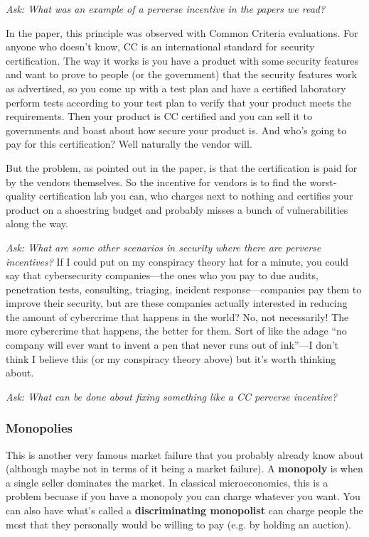 \documentclass[11pt]{article}
\begin{document}
{\it Ask: What was an example of a perverse incentive in the papers we read? }

In the paper, this principle was observed with Common Criteria evaluations. For anyone who doesn’t know, CC is an international standard for security certification. The way it works is you have a product with some security features and want to prove to people (or the government) that the security features work as advertised, so you come up with a test plan and have a certified laboratory perform tests according to your test plan to verify that your product meets the requirements. Then your product is CC certified and you can sell it to governments and boast about how secure your product is. And who’s going to pay for this certification? Well naturally the vendor will. 

But the problem, as pointed out in the paper, is that the certification is paid for by the vendors themselves. So the incentive for vendors is to find the worst-quality certification lab you can, who charges next to nothing and certifies your product on a shoestring budget and probably misses a bunch of vulnerabilities along the way. 

{\it Ask: What are some other scenarios in security where there are perverse incentives?} If I could put on my conspiracy theory hat for a minute, you could say that cybersecurity companies---the ones who you pay to due audits, penetration tests, consulting, triaging, incident response---companies pay them to improve their security, but are these companies actually interested in reducing the amount of cybercrime that happens in the world? No, not necessarily! The more cybercrime that happens, the better for them. Sort of like the adage ``no company will ever want to invent a pen that never runs out of ink''---I don't think I believe this (or my conspiracy theory above) but it's worth thinking about.

{\it Ask: What can be done about fixing something like a CC perverse incentive?}

\subsubsection{Monopolies}

This is another very famous market failure that you probably already know about (although maybe not in terms of it being a market failure). A {\bf monopoly} is when a single seller dominates the market. In classical microeconomics, this is a problem becuase if you have a monopoly you can charge whatever you want. You can also have what's called a {\bf discriminating monopolist} can charge people the most that they personally would be willing to pay (e.g. by holding an auction). 
\end{document}
